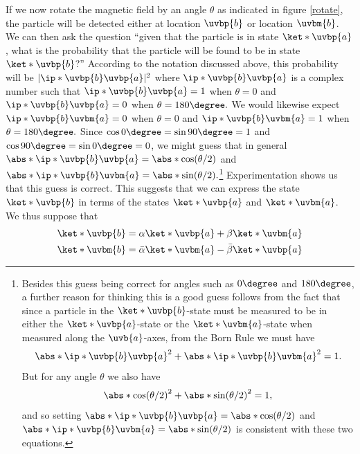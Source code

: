 \documentclass[12pt]{report}
\begin{document}
If we now rotate the magnetic field by an angle $\theta$ as indicated in figure \ref{rotate}, the particle will be detected either at location $\uvbp{b}$ or location $\uvbm{b}$. We can then ask the question “given that the particle is in state $\ket*{\uvbp{a}}$, what is the probability that the particle will be found to be in state $\ket*{\uvbp{b}}$?” According to the notation discussed above, this probability will be $|\ip*{\uvbp{b}}{\uvbp{a}}|^2$ where $\ip*{\uvbp{b}}{\uvbp{a}}$ is a complex number such that $\ip*{\uvbp{b}}{\uvbp{a}}=1$ when $\theta =0$ and $\ip*{\uvbp{b}}{\uvbp{a}}=0$ when $\theta=180\degree.$ We would likewise expect $\ip*{\uvbp{b}}{\uvbm{a}}=0$ when $\theta =0$ and $\ip*{\uvbp{b}}{\uvbm{a}}=1$ when $\theta=180\degree.$ Since $\cos 0\degree = \sin 90\degree = 1$ and $\cos 90\degree = \sin 0\degree = 0$, we might guess that in general $\abs*{\ip*{\uvbp{b}}{\uvbp{a}}}=\abs*{\cos(\theta/2)}$ and  $\abs*{\ip*{\uvbp{b}}{\uvbm{a}}}=\abs*{\sin(\theta/2)}.$\footnote{Besides this guess being correct for angles such as $0\degree$ and $180\degree$, a further reason for thinking this is a good guess follows from the fact that since a particle in the $\ket*{\uvbp{b}}$-state must be measured to be  in either the $\ket*{\uvbp{a}}$-state or the $\ket*{\uvbm{a}}$-state when measured along the $\uvb{a}$-axes, from the Born Rule we must have 
$$ \abs*{\ip*{\uvbp{b}}{\uvbp{a}}}^2+\abs*{\ip*{\uvbp{b}}{\uvbm{a}}}^2=1.$$
But for any angle $\theta$ we also have 
$$\abs*{\cos(\theta/2)}^2+\abs*{\sin(\theta/2)}^2=1,$$
and so setting $\abs*{\ip*{\uvbp{b}}{\uvbp{a}}}=\abs*{\cos(\theta/2)}$
and  $\abs*{\ip*{\uvbp{b}}{\uvbm{a}}}=\abs*{\sin(\theta/2)}$
is consistent with these two equations.} 
Experimentation shows us that this guess is correct.
This suggests that we can express the state $\ket*{\uvbp{b}}$ in terms of the states $\ket*{\uvbp{a}}$ and $\ket*{\uvbm{a}}$. We thus suppose that 
\begin{subequations}\label{vectoradd}
\begin{align}
\ket*{\uvbp{b}}&=\alpha\ket*{\uvbp{a}}+\beta\ket*{\uvbm{a}}\label{vectoradd1}\\
\ket*{\uvbm{b}}&=\bar{\alpha}\ket*{\uvbm{a}}-\bar{\beta}\ket*{\uvbp{a}}\label{vectoradd2}
\end{align} 
\end{subequations}
\end{document}
